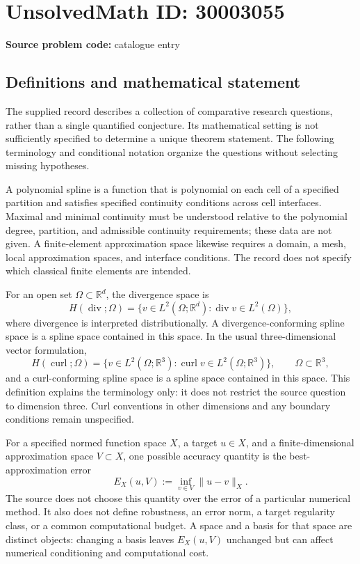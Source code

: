 \documentclass[11pt]{article}
\newcommand{\R}{\mathbb{R}}
\begin{document}
\section*{UnsolvedMath ID: 30003055}
\textbf{Source problem code:} catalogue entry
\subsection{Definitions and mathematical statement}
The supplied record describes a collection of comparative research questions, rather than a single quantified conjecture. Its mathematical setting is not sufficiently specified to determine a unique theorem statement. The following terminology and conditional notation organize the questions without selecting missing hypotheses.

A polynomial spline is a function that is polynomial on each cell of a specified partition and satisfies specified continuity conditions across cell interfaces. Maximal and minimal continuity must be understood relative to the polynomial degree, partition, and admissible continuity requirements; these data are not given. A finite-element approximation space likewise requires a domain, a mesh, local approximation spaces, and interface conditions. The record does not specify which classical finite elements are intended.

For an open set \(\Omega\subset\R^d\), the divergence space is
\[
H(\operatorname{div};\Omega)=\{v\in L^2(\Omega;\R^d):\operatorname{div}v\in L^2(\Omega)\},
\]
where divergence is interpreted distributionally. A divergence-conforming spline space is a spline space contained in this space. In the usual three-dimensional vector formulation,
\[
H(\operatorname{curl};\Omega)=\{v\in L^2(\Omega;\R^3):\operatorname{curl}v\in L^2(\Omega;\R^3)\},
\qquad \Omega\subset\R^3,
\]
and a curl-conforming spline space is a spline space contained in this space. This definition explains the terminology only: it does not restrict the source question to dimension three. Curl conventions in other dimensions and any boundary conditions remain unspecified.

For a specified normed function space \(X\), a target \(u\in X\), and a finite-dimensional approximation space \(V\subset X\), one possible accuracy quantity is the best-approximation error
\[
E_X(u,V):=\inf_{v\in V}\|u-v\|_X.
\]
The source does not choose this quantity over the error of a particular numerical method. It also does not define robustness, an error norm, a target regularity class, or a common computational budget. A space and a basis for that space are distinct objects: changing a basis leaves \(E_X(u,V)\) unchanged but can affect numerical conditioning and computational cost.
\end{document}
